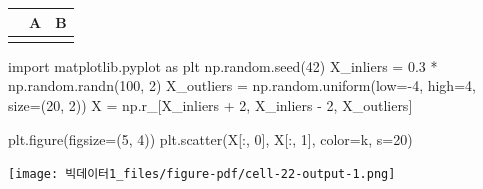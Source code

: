 \documentclass[
  a4paper,
  DIV=11,
  numbers=noendperiod]{scrreprt}
\newenvironment{Shaded}{\begin{snugshade}}{\end{snugshade}}
\newcommand{\DecValTok}[1]{\textcolor[rgb]{0.68,0.00,0.00}{#1}}
\newcommand{\FloatTok}[1]{\textcolor[rgb]{0.68,0.00,0.00}{#1}}
\newcommand{\ImportTok}[1]{\textcolor[rgb]{0.00,0.46,0.62}{#1}}
\newcommand{\NormalTok}[1]{\textcolor[rgb]{0.00,0.23,0.31}{#1}}
\newcommand{\OperatorTok}[1]{\textcolor[rgb]{0.37,0.37,0.37}{#1}}
\newcommand{\StringTok}[1]{\textcolor[rgb]{0.13,0.47,0.30}{#1}}
\begin{document}
\begin{longtable}[]{@{}lll@{}}
\toprule\noalign{}
& A & B \\
\midrule\noalign{}
\endhead
\bottomrule\noalign{}
\endlastfoot
\end{longtable}

\begin{Shaded}
\begin{Highlighting}[]
\ImportTok{import}\NormalTok{ matplotlib.pyplot }\ImportTok{as}\NormalTok{ plt}
\NormalTok{np.random.seed(}\DecValTok{42}\NormalTok{)}
\NormalTok{X\_inliers }\OperatorTok{=} \FloatTok{0.3} \OperatorTok{*}\NormalTok{ np.random.randn(}\DecValTok{100}\NormalTok{, }\DecValTok{2}\NormalTok{)}
\NormalTok{X\_outliers }\OperatorTok{=}\NormalTok{ np.random.uniform(low}\OperatorTok{={-}}\DecValTok{4}\NormalTok{, high}\OperatorTok{=}\DecValTok{4}\NormalTok{, size}\OperatorTok{=}\NormalTok{(}\DecValTok{20}\NormalTok{, }\DecValTok{2}\NormalTok{))}
\NormalTok{X }\OperatorTok{=}\NormalTok{ np.r\_[X\_inliers }\OperatorTok{+} \DecValTok{2}\NormalTok{, X\_inliers }\OperatorTok{{-}} \DecValTok{2}\NormalTok{, X\_outliers]}

\NormalTok{plt.figure(figsize}\OperatorTok{=}\NormalTok{(}\DecValTok{5}\NormalTok{, }\DecValTok{4}\NormalTok{))}
\NormalTok{plt.scatter(X[:, }\DecValTok{0}\NormalTok{], X[:, }\DecValTok{1}\NormalTok{], color}\OperatorTok{=}\StringTok{\textquotesingle{}k\textquotesingle{}}\NormalTok{, s}\OperatorTok{=}\DecValTok{20}\NormalTok{)}
\end{Highlighting}
\end{Shaded}

\texttt{[image: 빅데이터1\_files/figure-pdf/cell-22-output-1.png]}
\end{document}
